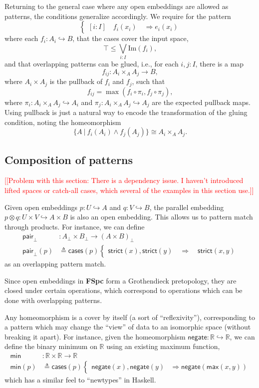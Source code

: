 \documentclass[conference]{IEEEtran}
\newcommand{\hookto}{\hookrightarrow}
\newcommand{\R}{\mathbb{R}}
\newcommand{\suchthat}{\ |\ }
\newcommand{\Img}[1]{\text{Im}\left({#1}\right)}
\newcommand{\negate}{\mathsf{negate}}
\newcommand{\Branch}{\Rightarrow}
\newcommand{\note}[1]{\textcolor{red}{[[{#1}]]}}
\begin{document}
Returning to the general case where any open embeddings are allowed as patterns, the conditions generalize accordingly. We require for the pattern
\[
\begin{cases}
[i : I] \quad f_i(x_i) \quad \Branch e_i(x_i)
\end{cases}
\]
where each $f_i : A_i \hookto B$, that the cases cover the input space,
\[
\top \le \bigvee_{i : I} \Img{f_i},
\]
and that overlapping patterns can be glued, i.e., for each $i, j : I$, there is a map
\[
f_{ij} : A_i \times_A A_j \to B,
\]
where $A_i \times A_j$ is the pullback of $f_i$ and $f_j$, such that 
\[
f_{ij} = \max(f_i \circ \pi_i, f_j \circ \pi_j),
\]
where $\pi_i : A_i \times_A A_j \hookto A_i$ and $\pi_j : A_i \times_A A_j \hookto A_j$ are the expected pullback maps. Using pullback is just a natural way to encode the transformation of the gluing condition, noting the homeomorphism
\[
 \{A \suchthat f_i(A_i) \wedge f_j(A_j) \} \cong A_i \times_A A_j.
\]

\subsection{Composition of patterns}

\note{Problem with this section: There is a dependency issue. I haven't introduced lifted spaces or catch-all cases, which several of the examples in this section use.}

Given open embeddings $p : U \hookto A$ and $q : V \hookto B$, the parallel embedding $p \otimes q : U \times V \hookto A \times B$ is also an open embedding. This allows us to pattern match through products. 
For instance, we can define
\begin{align*}
 \mathsf{pair}_\bot &: A_\bot \times B_\bot \to \left( A \times B \right)_\bot
\\ \mathsf{pair}_\bot(p) &\triangleq \mathsf{cases}(p)
\begin{cases}
\mathsf{strict}(x) , \mathsf{strict}(y)
  \quad \Branch \quad \mathsf{strict}(x, y)
\end{cases}
\end{align*}
as an overlapping pattern match.

Since open embeddings in \textbf{FSpc} form a Grothendieck pretopology, they are closed under certain operations, which correspond to operations which can be done with overlapping patterns.

Any homeomorphism is a cover by itself (a sort of ``reflexivity''), corresponding to a pattern which may change the ``view'' of data to an isomorphic space (without breaking it apart). For instance, given the homeomorphism $\negate : \R \hookto \R$, we can define the binary minimum on $\R$ using an existing maximum function,
\begin{align*}
\mathsf{min} &: \R \times \R \to \R
\\ \mathsf{min}(p) &\triangleq \mathsf{cases}(p)
\begin{cases}
\negate(x), \negate(y) &\Branch \negate(\mathsf{max}(x, y))
\end{cases}
\end{align*}
which has a similar feel to ``newtypes'' in Haskell.
\end{document}
